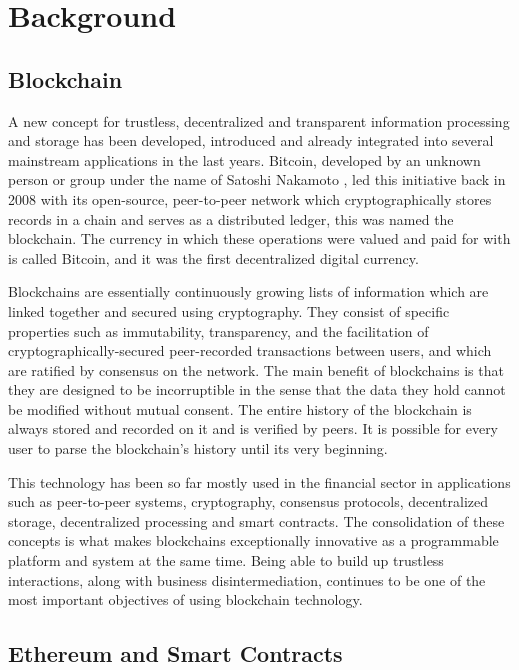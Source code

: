 \chapter{Background}
\section{Blockchain}

A new concept for trustless, decentralized and transparent information processing and storage has been developed, introduced and already integrated into several mainstream applications in the last years. Bitcoin, developed by an unknown person or group under the name of Satoshi Nakamoto \cite{nakamoto2008bitcoin}, led this initiative back in 2008 with its open-source, peer-to-peer network which cryptographically stores records in a chain and serves as a distributed ledger, this was named the blockchain. The currency in which these operations were valued and paid for with is called Bitcoin, and it was the first decentralized digital currency.

Blockchains are essentially continuously growing lists of information which are linked together and secured using cryptography. They consist of specific properties such as immutability, transparency, and the facilitation of cryptographically-secured peer-recorded transactions between users, and which are ratified by consensus on the network.
The main benefit of blockchains is that they are designed to be incorruptible in the sense that the data they hold cannot be modified without mutual consent. The entire history of the blockchain is always stored and recorded on it and is verified by peers. It is possible for every user to parse the blockchain's history until its very beginning.

This technology has been so far mostly used in the financial sector in applications such as peer-to-peer systems, cryptography, consensus protocols, decentralized storage, decentralized processing and smart contracts. The consolidation of these concepts is what makes blockchains exceptionally innovative as a programmable platform and system at the same time.
Being able to build up trustless interactions, along with business disintermediation, continues to be one of the most important objectives of using blockchain technology.

\section{Ethereum and Smart Contracts}

